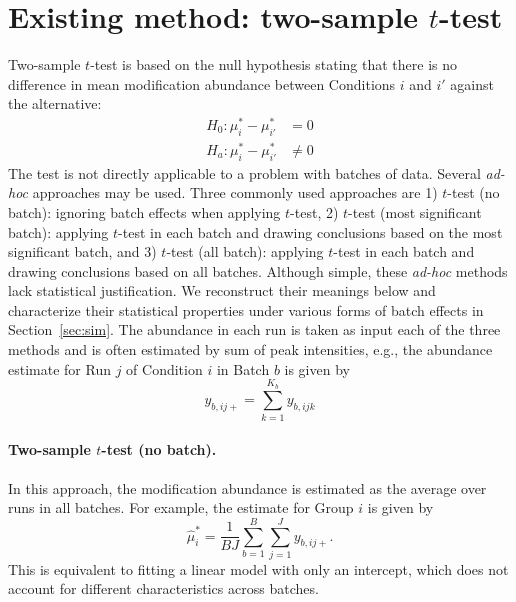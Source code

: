 \documentclass{mcp}
\def\secref#1{Section~\ref{#1}}
\begin{document}
\section{Existing method: two-sample $t$-test}
\label{sec:ttest}

Two-sample $t$-test is based on the null hypothesis stating that there is no difference in mean modification abundance between Conditions $i$ and $i'$ against the alternative: 
\begin{align*}
H_{0}: \mu_{i}^{\ast} - \mu_{i'}^{\ast} &= 0\\
H_{a}: \mu_{i}^{\ast} - \mu_{i'}^{\ast} &\neq 0
\end{align*}
The test is not directly applicable to a problem with batches of data. Several \textit{ad-hoc} approaches may be used. Three commonly used approaches are 1) $t$-test (no batch): ignoring batch effects when applying $t$-test, 2) $t$-test (most significant batch): applying $t$-test in each batch and drawing conclusions based on the most significant batch, and 3) $t$-test (all batch): applying $t$-test in each batch and drawing conclusions based on all batches. Although simple, these \textit{ad-hoc} methods lack statistical justification. We reconstruct their meanings below and characterize their statistical properties under various forms of batch effects in \secref{sec:sim}. The abundance in each run is taken as input each of the three methods and is often estimated by sum of peak intensities, e.g., the abundance estimate for Run $j$ of Condition $i$ in Batch $b$ is given by
\[
y_{b, ij+} = \sum_{k=1}^{K_b} y_{b, ijk}
\]



\paragraph{Two-sample $t$-test (no batch).}
In this approach, the modification abundance is estimated as the average over runs in all batches. For example, the estimate for Group $i$ is given by
\[
\hat{\mu}_{i}^{\ast} = \frac{1}{BJ} \sum_{b=1}^{B} \sum_{j=1}^{J} y_{b, ij+}.
\]
This is equivalent to fitting a linear model with only an intercept, which does not account for different characteristics across batches. 
\end{document}
